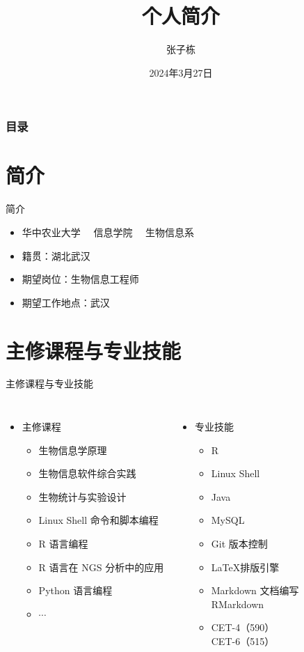 \documentclass{beamer}
\author[张子栋]{张子栋}
\title[个人简介]{个人简介}
\institute[HZAU CoI]{华中农业大学
	
	信息学院}
\date[2024年3月27日]{2024年3月27日}
\begin{document}
	\kaishu
	
	\frame{\titlepage}
	
	\begin{frame}
		\frametitle{目录}
		\tableofcontents
	\end{frame}
	
	\section{简介}
	\begin{frame}{简介}
		\begin{itemize}
			\item 华中农业大学 \ \  信息学院 \ \  生物信息系
			\item 籍贯：湖北武汉
			\item 期望岗位：生物信息工程师
			\item 期望工作地点：武汉
		\end{itemize}
	\end{frame}

	\section{主修课程与专业技能}
	\begin{frame}{主修课程与专业技能}
		\begin{columns}
			\column{0.5\textwidth}
			\begin{itemize}
				\item 主修课程
				\begin{itemize}
					\item 生物信息学原理
					\item 生物信息软件综合实践
					\item 生物统计与实验设计
					\item Linux Shell 命令和脚本编程
					\item R 语言编程
					\item R 语言在 NGS 分析中的应用
					\item Python 语言编程
					\item $\cdots$
				\end{itemize}
			\end{itemize}

			\column{0.5\textwidth}
			\begin{itemize}
				\item 专业技能
				\begin{itemize}
					\item R 
					\item Linux Shell
					\item Java
					\item MySQL
					\item Git 版本控制
					\item \LaTeX 排版引擎
					\item Markdown 文档编写\\RMarkdown
					\item CET-4（590）\\ CET-6（515）
				\end{itemize}
			\end{itemize}
		\end{columns}
	\end{frame}
	
\end{document}
